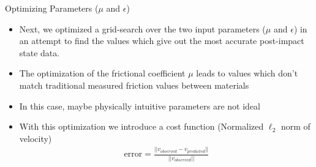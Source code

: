 \begin{frame}{Optimizing Parameters ($\mu$ and $\epsilon$)}
\begin{itemize}
    \item  Next, we optimized a grid-search over the two input parameters ($\mu$ and $\epsilon$) in an attempt to find the values which give out the most accurate post-impact state data.
    \item The optimization of the frictional coefficient $\mu$ leads to values which don't match traditional measured friction values between materials
    \item In this case,  maybe physically intuitive parameters are not ideal
    
    \item With this optimization we introduce a cost function \cite{nima2} (Normalized $\ell_2$ norm of velocity)
    \begin{align*}
        \mbox{error} = \frac{||v_{observed} - v_{predicted}||}{||v_{observed}||}
    \end{align*}
    
\end{itemize}

 
    
\end{frame}

